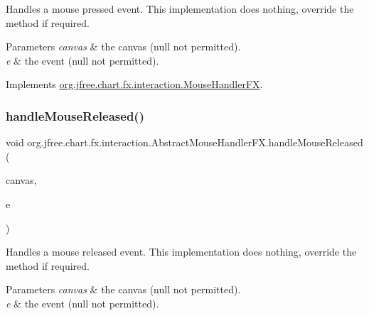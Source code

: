 Handles a mouse pressed event. This implementation does nothing, override the method if required.


\begin{DoxyParams}{Parameters}
{\em canvas} & the canvas ({\ttfamily null} not permitted). \\
\hline
{\em e} & the event ({\ttfamily null} not permitted). \\
\hline
\end{DoxyParams}


Implements \mbox{\hyperlink{interfaceorg_1_1jfree_1_1chart_1_1fx_1_1interaction_1_1_mouse_handler_f_x_a0cf92e5a448b58c199fc12dbdbd39aab}{org.\+jfree.\+chart.\+fx.\+interaction.\+Mouse\+Handler\+FX}}.

\mbox{\label{classorg_1_1jfree_1_1chart_1_1fx_1_1interaction_1_1_abstract_mouse_handler_f_x_af21b170ff087139926d7cca2ac1c7479}} 
\subsubsection{\texorpdfstring{handle\+Mouse\+Released()}{handleMouseReleased()}}
{\footnotesize\ttfamily void org.\+jfree.\+chart.\+fx.\+interaction.\+Abstract\+Mouse\+Handler\+F\+X.\+handle\+Mouse\+Released (\begin{DoxyParamCaption}\item[{\mbox{\hyperlink{classorg_1_1jfree_1_1chart_1_1fx_1_1_chart_canvas}{Chart\+Canvas}}}]{canvas,  }\item[{Mouse\+Event}]{e }\end{DoxyParamCaption})}

Handles a mouse released event. This implementation does nothing, override the method if required.


\begin{DoxyParams}{Parameters}
{\em canvas} & the canvas ({\ttfamily null} not permitted). \\
\hline
{\em e} & the event ({\ttfamily null} not permitted). \\
\hline
\end{DoxyParams}


